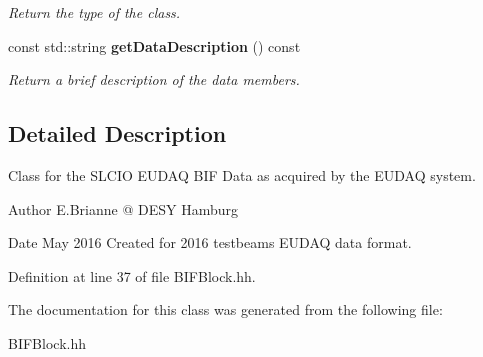 \begin{DoxyCompactItemize}
\begin{DoxyCompactList}\small\item\em Return the type of the class. \item\end{DoxyCompactList}\item 
const std::string {\bf getDataDescription} () const \label{classCALICE_1_1BIFBlock_a103f8aa8e9bc3073acfd2adb865342f0}

\begin{DoxyCompactList}\small\item\em Return a brief description of the data members. \item\end{DoxyCompactList}\end{DoxyCompactItemize}


\subsection{Detailed Description}
Class for the SLCIO EUDAQ BIF Data as acquired by the EUDAQ system. \begin{DoxyAuthor}{Author}
E.Brianne @ DESY Hamburg 
\end{DoxyAuthor}
\begin{DoxyDate}{Date}
May 2016 Created for 2016 testbeams EUDAQ data format. 
\end{DoxyDate}


Definition at line 37 of file BIFBlock.hh.

The documentation for this class was generated from the following file:\begin{DoxyCompactItemize}
\item 
BIFBlock.hh\end{DoxyCompactItemize}
